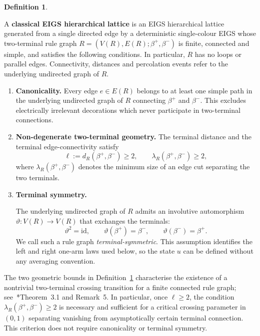 \documentclass[scheme=plain,11pt]{ctexart}
\theoremstyle{definition}
\newtheorem{definition}[theorem]{Definition}
\theoremstyle{remark}
\newcommand{\dist}{d}
\begin{document}
\begin{definition}\label{def:standing}

A \textbf{classical EIGS hierarchical lattice} is an EIGS hierarchical lattice generated from a single directed edge by a deterministic single-colour EIGS whose two-terminal rule graph $R=(V(R),E(R);\beta^+,\beta^-)$ is finite, connected and simple, and satisfies the following conditions.
In particular, $R$ has no loops or parallel edges.
Connectivity, distances and percolation events refer to the underlying undirected graph of $R$.

\begin{enumerate}
\item \textbf{Canonicality.}
Every edge $e\in E(R)$ belongs to at least one simple path in the underlying undirected graph of $R$ connecting $\beta^+$ and $\beta^-$.
This excludes electrically irrelevant decorations which never participate in two-terminal connections.

\item \textbf{Non-degenerate two-terminal geometry.}
The terminal distance and the terminal edge-connectivity satisfy
\[
   \ell:=\dist_R(\beta^+,\beta^-)\ge 2,
   \qquad
   \lambda_R(\beta^+,\beta^-)\ge 2,
\]
where $\lambda_R(\beta^+,\beta^-)$ denotes the minimum size of an edge cut separating the two terminals.

\item \textbf{Terminal symmetry.}

The underlying undirected graph of $R$ admits an involutive automorphism $\vartheta:V(R)\longrightarrow V(R)$ that exchanges the terminals:
\[
   \vartheta^2=\mathrm{id},\qquad
   \vartheta(\beta^+)=\beta^-,\qquad
   \vartheta(\beta^-)=\beta^+.
\]
We call such a rule graph \emph{terminal-symmetric}.
This assumption identifies the left and right one-arm laws used below, so the state $u$ can be defined without any averaging convention.
\end{enumerate}
\end{definition}

The two geometric bounds in Definition~\ref{def:standing} characterise the existence of a nontrivial two-terminal crossing transition for a finite connected rule graph; see~\cite{alves2026percolation}*{Theorem~3.1 and Remark~5}.
In particular, once $\ell\ge2$, the condition $\lambda_R(\beta^+,\beta^-)\ge2$ is necessary and sufficient for a critical crossing parameter in $(0,1)$ separating vanishing from asymptotically certain terminal connection.
This criterion does not require canonicality or terminal symmetry.
\end{document}
